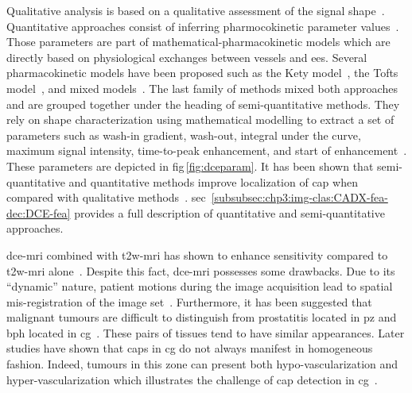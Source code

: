 Qualitative analysis is based on a qualitative assessment of the signal
shape~\cite{Hoeks2011}.
Quantitative approaches consist of inferring pharmocokinetic parameter
values~\cite{Tofts2010}.
Those parameters are part of mathematical-pharmacokinetic models which are
directly based on physiological exchanges between vessels and \ac{ees}.
Several pharmacokinetic models have been proposed such as the Kety
model~\cite{Kety1951}, the Tofts model~\cite{Tofts1997}, and mixed
models~\cite{Larsson1996,StLawrence1998}.
The last family of methods mixed both approaches and are grouped together under
the heading of semi-quantitative methods.
They rely on shape characterization using mathematical modelling to extract a
set of parameters such as wash-in gradient, wash-out, integral under the curve,
maximum signal intensity, time-to-peak enhancement, and start of
enhancement~\cite{Hoeks2011,Verma2012}.
These parameters are depicted in \acs{fig}\,\ref{fig:dceparam}.
It has been shown that semi-quantitative and quantitative methods improve
localization of \ac{cap} when compared with qualitative
methods~\cite{Rosenkrantz2013}.
\Ac{sec}~\ref{subsubsec:chp3:img-clas:CADX-fea-dec:DCE-fea} provides a full
description of quantitative and semi-quantitative approaches.

\ac{dce}-\ac{mri} combined with \ac{t2w}-\ac{mri} has shown to enhance
sensitivity compared to \ac{t2w}-\ac{mri}
alone~\cite{Jager1997,Kim2005,Schlemmer2004,Zelhof2009}.
Despite this fact, \ac{dce}-\ac{mri} possesses some drawbacks.
Due to its ``dynamic'' nature, patient motions during the image acquisition
lead to spatial mis-registration of the image set~\cite{Verma2012}.
Furthermore, it has been suggested that malignant tumours are difficult to
distinguish from prostatitis located in \ac{pz} and \ac{bph} located in
\ac{cg}~\cite{Hoeks2011,Verma2012}.
These pairs of tissues tend to have similar appearances.
Later studies have shown that \acp{cap} in \ac{cg} do not always manifest in
homogeneous fashion.
Indeed, tumours in this zone can present both hypo-vascularization and
hyper-vascularization which illustrates the challenge of \ac{cap} detection in
\ac{cg}~\cite{Niekerk2013}.

